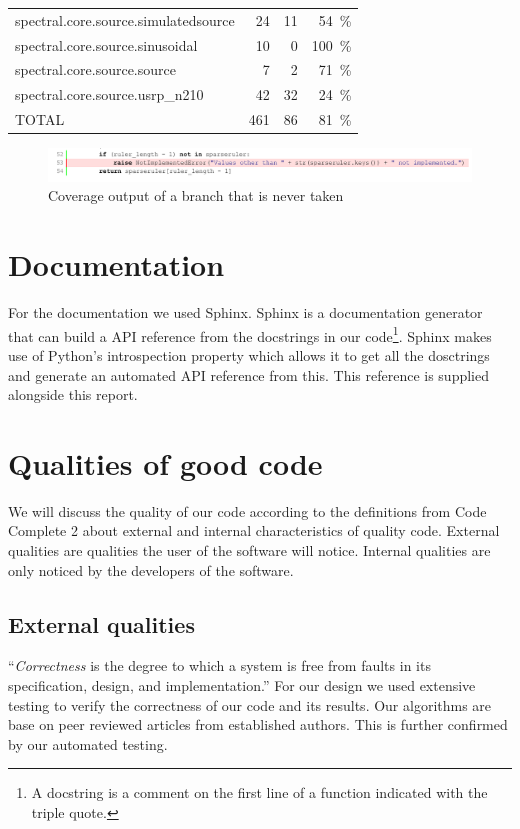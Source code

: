 \documentclass[a4paper, openany, oneside]{memoir}
\begin{document}
\begin{table}
{\begin{tabular}{l r r r}
spectral.core.source.simulatedsource       & 24         & 11   & \SI{54}{\percent}\\
spectral.core.source.sinusoidal            & 10         & 0    & \SI{100}{\percent} \\
spectral.core.source.source                & 7          & 2    & \SI{71}{\percent}\\
spectral.core.source.usrp\_n210            & 42         & 32   & \SI{24}{\percent}\\
\midrule
TOTAL                                      & 461        & 86   & \SI{81}{\percent}\\
\bottomrule
\end{tabular}}
\label{tbl:coverage}
\end{table}


\begin{figure}[h]
    \centering
    \includegraphics[width=\textwidth]{fig_branch_coverage.pdf}
    \caption{Coverage output of a branch that is never taken}
    \label{fig:coverage_branch}
\end{figure}

\section{Documentation}
\label{sec:documentation}
For the documentation we used Sphinx. Sphinx is a documentation generator that can build a API reference from the docstrings in our code\footnote{A docstring is a comment on the first line of a function indicated with the triple quote.}. Sphinx makes use of Python's introspection property which allows it to get all the dosctrings and generate an automated API reference from this. This reference is supplied alongside this report.

\section{Qualities of good code}
We will discuss the quality of our code according to the definitions from Code Complete 2 about external and internal characteristics of quality code. External qualities are qualities the user of the software will notice. Internal qualities are only noticed by the developers of the software.\cite{mcconnell2004code}

\subsection{External qualities}
``\textit{Correctness} is the degree to which a system is free from faults in its specification, design, and implementation.'' For our design we used extensive testing to verify the correctness of our code and its results. Our algorithms are base on peer reviewed articles from established authors. This is further confirmed by our automated testing.
\end{document}
